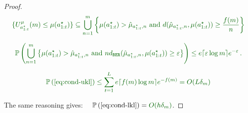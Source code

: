\begin{proof}
	
	\begin{equation*}
	\diff{\{U^{\mu}_{a^{\star}_{1:t}}(m) \leq \mu(a^{\star}_{1:t})\} \subseteq \bigcup_{n=1}^m \left\{ \mu(a^{\star}_{1:t}) > \hat{\mu}_{a^{\star}_{1:t}, n} \text{ and } d(\hat{\mu}_{a^{\star}_{1:t}, n}, \mu(a^{\star}_{1:t})) \geq \frac{f(m)}{n} \right\}}
	\end{equation*}
	
	
	\begin{equation*}
	\diff{\probability{\bigcup_{n=1}^m \left\{ \mu(a^{\star}_{1:t}) > \hat{\mu}_{a^{\star}_{1:t}, n} \text{ and } n \dber(\hat{\mu}_{a^{\star}_{1:t}, n}, \mu(a^{\star}_{1:t})) \geq \epsilon \right\}} \leq e\ceil{\epsilon \log m}e^{-\epsilon}\,.}
	\end{equation*}
	
	\begin{align*}
	\diff{\probability{\eqref{eq:cond-ukl}} \leq \sum_{t=1}^L e\ceil{f(m)\log m}e^{-f(m)} = O(L\delta_m)}
	\end{align*}
	
	The same reasoning gives: $\quad\displaystyle{
		\probability{\eqref{eq:cond-lkl}} = \diff{O(h\delta_m)}}$.
\end{proof}

